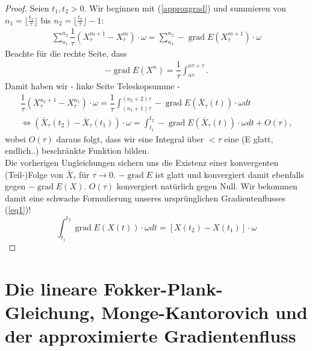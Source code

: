 \documentclass[11pt,a4paper,notitlepage]{scrreprt}
\newcommand{\grad}{\operatorname{grad}}
\begin{document}
\begin{proof}
Seien $t_1,t_2>0$. Wir beginnen mit (\ref{approxgrad}) und summieren von $n_1=\lfloor\frac{t_1}{\tau}\rfloor$ bis $n_2=\lfloor\frac{t_2}{\tau}\rfloor-1$:\\
\begin{align}
\sum_{n_1}^{n_2}\dfrac{1}{\tau} (X_\tau^{m+1}-X_\tau^m)\cdot\omega=\sum_{n_1}^{n_2}-\grad E(X_\tau^{m+1})\cdot\omega
\end{align}
Beachte für die rechte Seite, dass  
\begin{align*}
-\grad E(X^n)=\dfrac{1}{\tau}\int_{n\tau}^{n\tau+\tau}.
\end{align*}
Damit haben wir - linke Seite Teleskopsumme -
\begin{align}
\dfrac{1}{\tau}(X_\tau^{n_2+1}-X_\tau^{n_1})\cdot\omega=\dfrac{1}{\tau}\int_{(n_1+1)\tau}^{(n_2+2)\tau}-\grad E(\bar{X}_\tau(t))\cdot\omega dt\\
\Leftrightarrow (\bar{X}_\tau(t_2)-\bar{X}_\tau(t_1))\cdot\omega = \int_{t_1}^{t_2}-\grad E(\bar{X}_\tau(t))\cdot\omega dt+O(\tau),
\end{align}
wobei $O(\tau)$ daraus folgt, dass wir eine Integral über $<\tau$ eine (E glatt, endlich..) beschränkte Funktion bilden. \\
Die vorherigen Ungleichungen sichern uns die Existenz einer konvergenten (Teil-)Folge von $\bar{X}_\tau$ für $\tau\to 0$. $-\grad E$ ist glatt und konvergiert damit ebenfalls gegen $-\grad E(X)$. $O(\tau)$ konvergiert natürlich gegen Null. Wir bekommen damit eine schwache Formulierung unseres ursprünglichen Gradientenflusses (\ref{eq1})!
\begin{equation*}
\int_{t_1}^{t_2}\grad E(X(t))\cdot \omega dt = [X(t_2)-X(t_1)]\cdot\omega
\end{equation*}

\end{proof}

 

\newpage
\section{Die lineare Fokker-Plank-Gleichung, Monge-Kantorovich und der approximierte Gradientenfluss}
\end{document}
